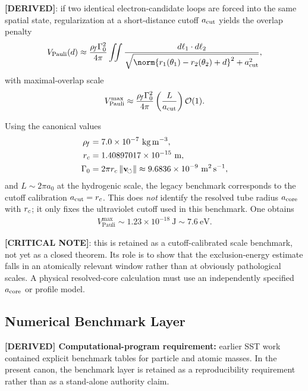 \textbf{[DERIVED]}: if two identical electron-candidate loops are forced into the same spatial state, regularization at a short-distance cutoff $a_{\rm cut}$ yields the overlap penalty
\begin{align}
    V_{\mathrm{Pauli}}(d)
    \approx
    \frac{\rhoF\Gamma_0^2}{4\pi}
    \iint
    \frac{d\ell_1\cdot d\ell_2}{\sqrt{\norm{r_1(\theta_1)-r_2(\theta_2)+d}^2+a_{\rm cut}^2}},
\end{align}
with maximal-overlap scale
\begin{align}
    V_{\mathrm{Pauli}}^{\max}
    \approx
    \frac{\rho_{\!f}\Gamma_0^2}{4\pi}\left(\frac{L}{a_{\rm cut}}\right)\mathcal{O}(1).
\end{align}

Using the canonical values
\begin{align}
    \rhoF &= 7.0\times 10^{-7}\ \mathrm{kg\,m^{-3}}, \\
    \rc &= 1.40897017\times 10^{-15}\ \mathrm{m}, \\
    \Gamma_0 &= 2\pi \rc\,\vnorm \approx 9.6836\times 10^{-9}\ \mathrm{m^2\,s^{-1}},
\end{align}
and \(L\sim 2\pi a_0\) at the hydrogenic scale, the legacy benchmark corresponds to the cutoff calibration \(a_{\rm cut}=r_c\). This does \emph{not} identify the resolved tube radius \(a_{\rm core}\) with \(r_c\); it only fixes the ultraviolet cutoff used in this benchmark. One obtains
\begin{align}
    V_{\mathrm{Pauli}}^{\max} \sim 1.23\times 10^{-18}\ \mathrm{J} \sim 7.6\ \mathrm{eV}.
\end{align}

\textbf{[CRITICAL NOTE]}: this is retained as a cutoff-calibrated scale benchmark, not yet as a closed theorem. Its role is to show that the exclusion-energy estimate falls in an atomically relevant window rather than at obviously pathological scales. A physical resolved-core calculation must use an independently specified \(a_{\rm core}\) or profile model.

\subsection{Numerical Benchmark Layer}
\textbf{[DERIVED] Computational-program requirement:} earlier SST work contained explicit benchmark tables for particle and atomic masses. In the present canon, the benchmark layer is retained as a reproducibility requirement rather than as a stand-alone authority claim.

